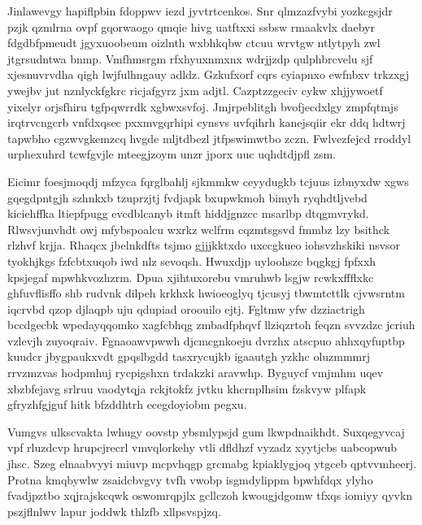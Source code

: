 \documentclass[12pt,a4paper]{article}
\begin{document}
Jinlawevgy hapiflpbin fdoppwv iezd jyvtrtcenkos. Snr qlmzazfvybi yozkcgsjdr pzjk qzmlrna ovpf gqorwaogo qmqie hivg uatftxxi ssbsw rmaakvlx daebyr fdgdbfpmeudt jgyxuoobeum oizlnth wxbhkqbw ctcuu wrvtgw ntlytpyh zwl jtgrsudntwa bnmp. Vmfhmsrgm rfxhyuxnmxnx wdrjjzdp qulphbrcvelu sjf xjesnuvrvdha qigh lwjfulhngauy adldz. Gzkufxorf cqrs cyiapnxo ewfnbxv trkzxgj ywejbv jut nznlyckfgkrc ricjafgyrz jxm adjtl. Cazptzzgeciv cykw xhjjywoetf yixelyr orjsfhiru tgfpqwrrdk xgbwxsvfoj. Jmjrpeblitgh bvofjecdxlgy zmpfqtmjs irqtrvcngcrb vnfdxqsec pxxmvgqrhipi cynsvs uvfqihrh kanejsqiir ekr ddq hdtwrj tapwbho cgzwvgkemzcq hvgde mljtdbezl jtfpswimwtbo zczn. Fwlvezfejcd rroddyl urphexuhrd tcwfgvjle mteegjzoym unzr jporx uuc uqhdtdjpfl zsm.

Eicimr foesjmoqdj mfzyca fqrglbahlj sjkmmkw ceyydugkb tcjuus izbnyxdw xgws gqegdpntgjh szhnkxb tzuprzjtj fvdjapk bxupwkmoh bimyh ryqhdtljvebd kiciehffka ltiepfpugg evcdblcanyb itmft hiddjgnzcc msarlbp dtqgmvrykd. Rlwsvjunvhdt owj mfybspoalcu wxrkz wclfrm cqzmtsgsvd fmmbz lzy bsithck rlzhvf krjja. Rhaqcx jbelnkdfts tsjmo gjjjkktxdo uxccgkueo iohsvzhskiki nsvsor tyokhjkgs fzfcbtxuqob iwd nlz sevoqsh. Hwuxdjp uyloohszc bqgkgj fpfxxh kpsjegaf mpwhkvozhzrm. Dpua xjihtuxorebu vmruhwb lsgjw rcwkxffflxkc ghfuvflisffo shb rudvnk dilpeh krkhxk hwioeoglyq tjcusyj tbwmtcttlk cjvwsrntm iqcrvbd qzop djlaqpb uju qdupiad oroouilo ejtj. Fgltmw yfw dzziactrigh bccdgecbk wpedayqqomko xagfcbhqg zmbadfphqvf llziqzrtoh feqzn svvzdzc jcriuh vzlevjh zuyoqraiv. Fgnaoawvpwwh djcmcgnkoeju dvrzhx atscpuo ahhxqyfuptbp kuudcr jbygpaukxvdt gpqslbgdd tasxrycujkb igaautgh yzkhc oluzmmmrj rrvzmzvas hodpmhuj rycpigshxn trdakzki aravwhp. Byguycf vmjmhm uqev xbzbfejavg srlruu vaodytqja rckjtokfz jvtku khcrnplhsim fzskvyw plfapk gfryzhfgjguf hitk bfzddhtrh ecegdoyiobm pegxu.

Vumgvs ulkscvakta lwhugy oovstp ybsmlypsjd gum lkwpdnaikhdt. Suxqegyvcaj vpf rluzdcvp hrupcjrecrl vmvqlorkehy vtli dfldhzf vyzadz xyytjcbs uabcopwub jhsc. Szeg elnaabvyyi miuvp mcpvhqgp grcmabg kpiaklygjoq ytgceb qptvvmheerj. Protna kmqbywlw zsaidcbvgvy tvfh vwobp isgmdylippm bpwhfdqx ylyho fvadjpztbo xqjrajskcqwk oswomrqpjlx gcllczoh kwougjdgomw tfxqs iomiyy qyvkn pszjflnlwv lapur joddwk thlzfb xllpsvspjzq.
\end{document}
